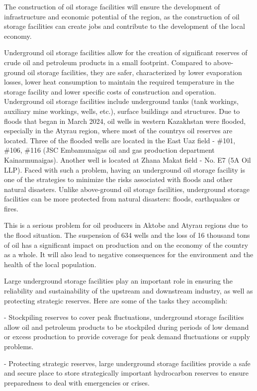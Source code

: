 \begin{multicols}{2}
The construction of oil storage facilities will ensure the development
of infrastructure and economic potential of the region, as the
construction of oil storage facilities can create jobs and contribute to
the development of the local economy.

Underground oil storage facilities allow for the creation of significant
reserves of crude oil and petroleum products in a small footprint.
Compared to above-ground oil storage facilities, they are safer,
characterized by lower evaporation losses, lower heat consumption to
maintain the required temperature in the storage facility and lower
specific costs of construction and operation. Underground oil storage
facilities include underground tanks (tank workings, auxiliary mine
workings, wells, etc.), surface buildings and structures. Due to floods
that began in March 2024, oil wells in western Kazakhstan were flooded,
especially in the Atyrau region, where most of the
country\textquotesingle s oil reserves are located. Three of the flooded
wells are located in the East Uaz field - \#101, \#106, \#116 (JSC
Embamunaigas oil and gas production department Kainarmunaigas). Another
well is located at Zhana Makat field - No. E7 (5A Oil LLP). Faced with
such a problem, having an underground oil storage facility is one of the
strategies to minimize the risks associated with floods and other
natural disasters. Unlike above-ground oil storage facilities,
underground storage facilities can be more protected from natural
disasters: floods, earthquakes or fires.

This is a serious problem for oil producers in Aktobe and Atyrau regions
due to the flood situation. The suspension of 634 wells and the loss of
16 thousand tons of oil has a significant impact on production and on
the economy of the country as a whole. It will also lead to negative
consequences for the environment and the health of the local population.

Large underground storage facilities play an important role in ensuring
the reliability and sustainability of the upstream and downstream
industry, as well as protecting strategic reserves. Here are some of the
tasks they accomplish:

- Stockpiling reserves to cover peak fluctuations, underground storage
facilities allow oil and petroleum products to be stockpiled during
periods of low demand or excess production to provide coverage for peak
demand fluctuations or supply problems.

- Protecting strategic reserves, large underground storage facilities
provide a safe and secure place to store strategically important
hydrocarbon reserves to ensure preparedness to deal with emergencies or
crises.


\end{multicols}
